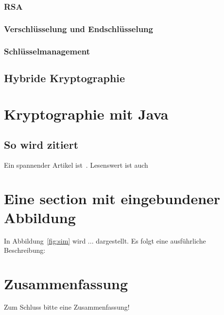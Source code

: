 \documentclass[paper=a4,11pt,german]{scrartcl} %
\begin{document}
\subsubsection{RSA}
\subsubsection{Verschlüsselung und Endschlüsselung}
\subsubsection{Schlüsselmanagement}
\subsection{Hybride Kryptographie}


\section{Kryptographie mit Java}

\subsection{So wird zitiert}
Ein spannender Artikel ist~\cite{LSSZ08}. Lesenswert ist auch~\cite{oasa_mediawiki}

\section{Eine section mit eingebundener Abbildung}

In Abbildung~\ref{fig:sim} wird ... dargestellt. Es folgt eine
ausführliche Beschreibung:


\section{Zusammenfassung}
Zum Schluss bitte eine Zusammenfassung!



\end{document}
